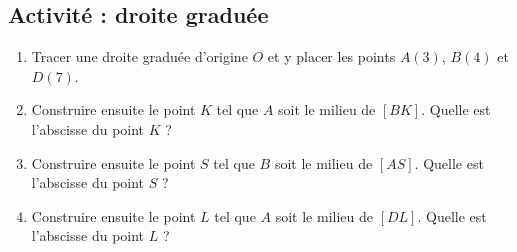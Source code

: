 
\subsection*{Activité : droite graduée}

\begin{enumerate}
    \item
        Tracer une droite graduée d'origine \( O\) et y placer les points \( A(3)\), \( B(4)\) et \( D(7)\). 

\begin{center}

\end{center}

    \item
        Construire ensuite le point \( K\) tel que \( A\) soit le milieu de \( [BK]\). Quelle est l'abscisse du point \( K \) ?
    \item
        Construire ensuite le point \( S\) tel que \( B\) soit le milieu de \( [AS]\). Quelle est l'abscisse du point \( S \) ?
    \item
        Construire ensuite le point \( L\) tel que \( A\) soit le milieu de \( [DL]\). Quelle est l'abscisse du point \( L \) ?
\end{enumerate}
